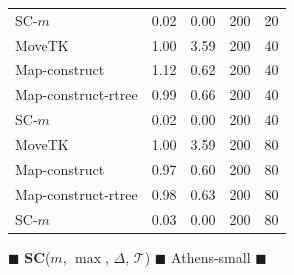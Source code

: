 \begin{figure}
\begin{center}
\begin{minipage}{0.5\textwidth}
\begin{tabular}{@{}lrrrr@{}}
        \medskip
SC-$m$ & 0.02 & 0.00 & 200 & 20\\
        MoveTK & 1.00 & 3.59 & 200 & 40\\
Map-construct & 1.12 & 0.62 & 200 & 40\\
Map-construct-rtree & 0.99 & 0.66 & 200 & 40\\
        \medskip
SC-$m$ & 0.02 & 0.00 & 200 & 40\\
        MoveTK & 1.00 & 3.59 & 200 & 80\\
Map-construct & 0.97 & 0.60 & 200 & 80\\
Map-construct-rtree & 0.98 & 0.63 & 200 & 80\\
        \medskip
SC-$m$ & 0.03 & 0.00 & 200 & 80\\
        \bottomrule
    \end{tabular}
\end{minipage}
%
        \caption{$\blacksquare$ \textbf{SC}($m$, $\max$, $\Delta$, $\mathcal{T}$) $\blacksquare$ Athens-small $\blacksquare$}
%
    \end{center} \end{figure}
\clearpage
\newpage 
%
\clearpage
%
